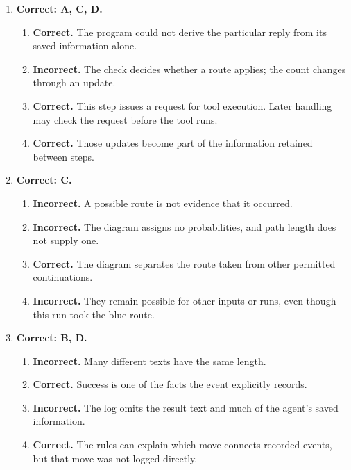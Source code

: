 \begin{enumerate}[start=1,itemsep=0.7\baselineskip]
\item[{\hyperref[exercise:6]{6.}}] \begin{minipage}[t]{\linewidth}
\textbf{Correct: A, C, D.}
\begin{enumerate}[label=\textnormal{(\Alph*)},leftmargin=*,itemsep=0pt]
\item \textbf{Correct.} The program could not derive the particular reply from its saved information alone.
\item \textbf{Incorrect.} The check decides whether a route applies; the count changes through an update.
\item \textbf{Correct.} This step issues a request for tool execution. Later handling may check the request before the tool runs.
\item \textbf{Correct.} Those updates become part of the information retained between steps.
\end{enumerate}
\end{minipage}

\item[{\hyperref[exercise:7]{7.}}] \begin{minipage}[t]{\linewidth}
\textbf{Correct: C.}
\begin{enumerate}[label=\textnormal{(\Alph*)},leftmargin=*,itemsep=0pt]
\item \textbf{Incorrect.} A possible route is not evidence that it occurred.
\item \textbf{Incorrect.} The diagram assigns no probabilities, and path length does not supply one.
\item \textbf{Correct.} The diagram separates the route taken from other permitted continuations.
\item \textbf{Incorrect.} They remain possible for other inputs or runs, even though this run took the blue route.
\end{enumerate}
\end{minipage}

\item[{\hyperref[exercise:8]{8.}}] \begin{minipage}[t]{\linewidth}
\textbf{Correct: B, D.}
\begin{enumerate}[label=\textnormal{(\Alph*)},leftmargin=*,itemsep=0pt]
\item \textbf{Incorrect.} Many different texts have the same length.
\item \textbf{Correct.} Success is one of the facts the event explicitly records.
\item \textbf{Incorrect.} The log omits the result text and much of the agent's saved information.
\item \textbf{Correct.} The rules can explain which move connects recorded events, but that move was not logged directly.
\end{enumerate}
\end{minipage}


\end{enumerate}
